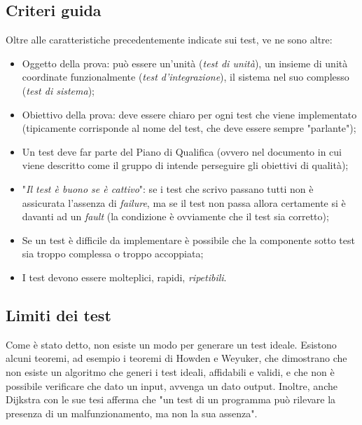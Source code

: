 \documentclass[../main]{subfiles}
\begin{document}
\subsection{Criteri guida}
Oltre alle caratteristiche precedentemente indicate sui test, ve ne sono altre:
\begin{itemize}
    \item Oggetto della prova: può essere un'unità (\textit{test di unità}), un insieme di unità coordinate funzionalmente (\textit{test d'integrazione}), il sistema nel suo complesso (\textit{test di sistema});
    \item Obiettivo della prova: deve essere chiaro per ogni test che viene implementato (tipicamente corrisponde al nome del test, che deve essere sempre "parlante");
    \item Un test deve far parte del Piano di Qualifica (ovvero nel documento in cui viene descritto come il gruppo di  intende perseguire gli obiettivi di qualità);
    \item "\textit{Il test è buono se è cattivo}": se i test che scrivo passano tutti non è assicurata l'assenza di \textit{failure}, ma se il test non passa allora certamente si è davanti ad un \textit{fault} (la condizione è ovviamente che il test sia corretto);
    \item Se un test è difficile da implementare è possibile che la componente sotto test sia troppo complessa o troppo accoppiata;
    \item I test devono essere molteplici, rapidi, \textit{ripetibili}.
\end{itemize}
\subsection{Limiti dei test}
Come è stato detto, non esiste un modo per generare un test ideale. Esistono alcuni teoremi, ad esempio i teoremi di Howden e Weyuker, che dimostrano che non esiste un algoritmo che generi i test ideali, affidabili e validi, e che non è possibile verificare che dato un input, avvenga un dato output.\newline
Inoltre, anche Dijkstra con le sue tesi afferma che "un test di un programma può rilevare la presenza di un malfunzionamento, ma non la sua assenza".
\end{document}
